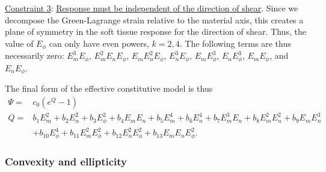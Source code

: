       \underline{Constraint 3}: \underline{Response must be independent of the direction of shear}. Since we decompose the Green-Lagrange strain relative to the material axis, this creates a plane of symmetry in the soft tissue response for the direction of shear. Thus, the value of $E_\phi$ can only have even powers, $k = 2,4$. The following terms are thus necessarily zero: $E_m^3E_\phi$, $E_m^2E_nE_\phi$, $E_mE_n^2E_\phi$, $E_n^3E_\phi$, $E_mE_\phi^3$, $E_nE_\phi^3$, $E_mE_\phi$, and $E_nE_\phi$. 
      
The final form of the effective constitutive model is thus
\begin{equation}
\begin{aligned}\label{eqn:generalizeexponentialform}
\Psi	=& c_0 \left(e^{Q} - 1\right) \\
Q		=& b_1 E_m^2 + b_2 E_n^2 + b_3 E_\phi^2 + b_4 E_m E_n + b_5 E_m^4 + b_6 E_n^4 + b_7 E_m^3 E_n + b_8 E_m^2 E_n^2 + b_9 E_m E_n^3	\\
	&+ b_{10} E_\phi^4 + b_{11} E_m^2E_\phi^2 + b_{12} E_n^2 E_\phi^2 + b_{13} E_m E_n E_\phi^2.
\end{aligned}
\end{equation}








\subsubsection{Convexity and ellipticity}

